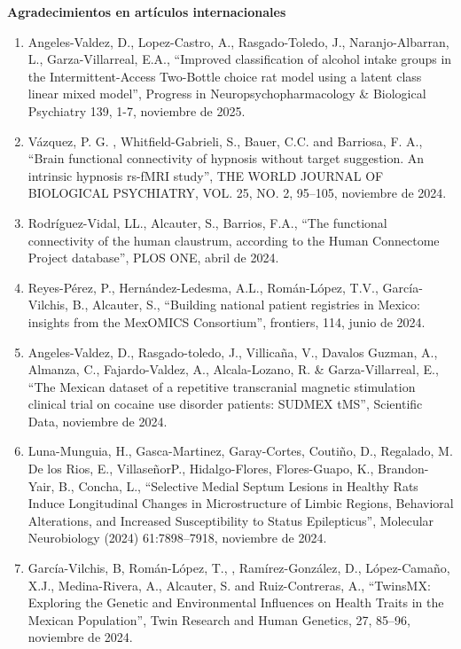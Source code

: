 \textbf{Agradecimientos en artículos internacionales}

\begin{enumerate}

\item Angeles-Valdez, D., Lopez-Castro, A., Rasgado-Toledo, J., Naranjo-Albarran, L., Garza-Villarreal, E.A., “Improved classification of 
alcohol 
intake groups in the Intermittent-Access Two-Bottle choice rat model using a latent class linear mixed model”, Progress in 
Neuropsychopharmacology \& Biological Psychiatry 139, 1-7, noviembre de 2025.

\item Vázquez, P. G. , Whitfield-Gabrieli, S., Bauer, C.C. and Barriosa, F. A., “Brain functional connectivity of hypnosis without target 
suggestion. An intrinsic hypnosis rs-fMRI study”, THE WORLD JOURNAL OF BIOLOGICAL PSYCHIATRY, VOL. 25, NO. 2, 95–105, noviembre de 2024.

\item Rodríguez-Vidal, LL., Alcauter, S., Barrios, F.A., “The functional connectivity of the human claustrum, according to the Human 
Connectome 
Project database”, PLOS ONE, abril de 2024.

\item Reyes-Pérez, P., Hernández-Ledesma, A.L., Román-López, T.V., García-Vilchis, B., Alcauter, S., “Building national patient registries in 
Mexico: insights from the MexOMICS Consortium”, frontiers, 114, junio de 2024.

\item Angeles-Valdez, D., Rasgado-toledo, J., Villicaña, V., Davalos Guzman, A., Almanza, C., Fajardo-Valdez, A., Alcala-Lozano, R. \& 
Garza-Villarreal, E., “The Mexican dataset of a repetitive transcranial magnetic stimulation clinical trial on cocaine use disorder patients: 
SUDMEX tMS”, Scientific Data, noviembre de 2024.

\item Luna-Munguia, H., Gasca-Martinez, Garay-Cortes, Coutiño, D., Regalado, M. De los Rios, E., VillaseñorP., Hidalgo-Flores, Flores-Guapo, 
K., 
Brandon-Yair, B., Concha, L., “Selective Medial Septum Lesions in Healthy Rats Induce Longitudinal Changes in Microstructure of Limbic 
Regions, Behavioral Alterations, and Increased Susceptibility to Status Epilepticus”, Molecular Neurobiology (2024) 61:7898–7918, noviembre 
de 2024.

\item García-Vilchis, B, Román-López, T., , Ramírez-González, D., López-Camaño, X.J., Medina-Rivera, A., Alcauter, S. and Ruiz-Contreras, A., 
“TwinsMX: Exploring the Genetic and Environmental Influences on Health Traits in the Mexican Population”, Twin Research and Human Genetics, 
27, 85–96, noviembre de 2024.


\end{enumerate}
